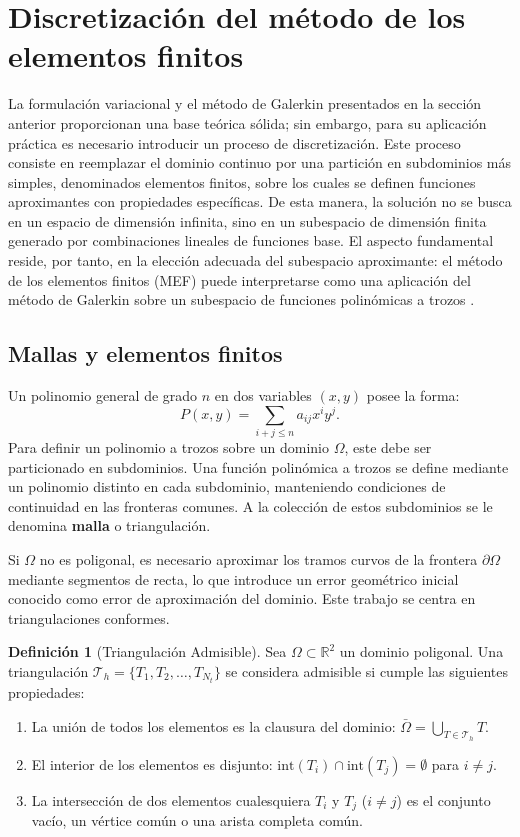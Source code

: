\documentclass[12pt, letterpaper]{report}
\theoremstyle{definition}
\newtheorem{definicion}{Definición}[chapter]
\begin{document}
\section{Discretización del método de los elementos finitos}

La formulación variacional y el método de Galerkin presentados en la sección anterior proporcionan una base teórica sólida; sin embargo, para su aplicación práctica es necesario introducir un proceso de discretización. Este proceso consiste en reemplazar el dominio continuo por una partición en subdominios más simples, denominados elementos finitos, sobre los cuales se definen funciones aproximantes con propiedades específicas. De esta manera, la solución no se busca en un espacio de dimensión infinita, sino en un subespacio de dimensión finita generado por combinaciones lineales de funciones base. El aspecto fundamental reside, por tanto, en la elección adecuada del subespacio aproximante: el método de los elementos finitos (MEF) puede interpretarse como una aplicación del método de Galerkin sobre un subespacio de funciones polinómicas a trozos \cite{ciarlet2002finite}.

\subsection{Mallas y elementos finitos}

Un polinomio general de grado $n$ en dos variables $(x, y)$ posee la forma:
\[
P(x,y) = \sum_{i+j \leq n} a_{ij} x^i y^j.
\]
Para definir un polinomio a trozos sobre un dominio $\Omega$, este debe ser particionado en subdominios. Una función polinómica a trozos se define mediante un polinomio distinto en cada subdominio, manteniendo condiciones de continuidad en las fronteras comunes. A la colección de estos subdominios se le denomina \textbf{malla} o triangulación.

Si $\Omega$ no es poligonal, es necesario aproximar los tramos curvos de la frontera $\partial \Omega$ mediante segmentos de recta, lo que introduce un error geométrico inicial conocido como error de aproximación del dominio. Este trabajo se centra en triangulaciones conformes.

\begin{definicion}[Triangulación Admisible]
    Sea $\Omega \subset \mathbb{R}^{2}$ un dominio poligonal. Una triangulación $\mathcal{T}_h = \{ T_1, T_2, \ldots, T_{N_{t}} \}$ se considera admisible si cumple las siguientes propiedades:
    \begin{enumerate}
        \item La unión de todos los elementos es la clausura del dominio: $\bar{\Omega} = \bigcup_{T \in \mathcal{T}_h} T$.
        \item El interior de los elementos es disjunto: $\text{int}(T_i) \cap \text{int}(T_j) = \emptyset$ para $i \neq j$.
        \item La intersección de dos elementos cualesquiera $T_i$ y $T_j$ ($i \neq j$) es el conjunto vacío, un vértice común o una arista completa común.
    \end{enumerate}
\end{definicion}
\end{document}
